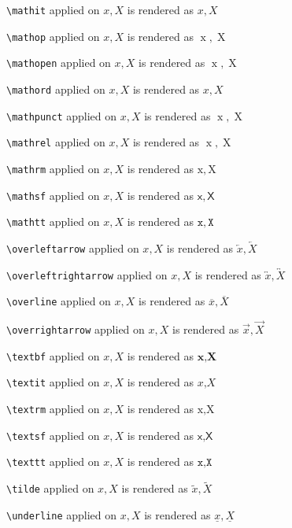 \texttt{\textbackslash mathit} applied on $x,X$ is rendered as $\mathit{x},\mathit{X}$


\texttt{\textbackslash mathop} applied on $x,X$ is rendered as $\mathop{x},\mathop{X}$


\texttt{\textbackslash mathopen} applied on $x,X$ is rendered as $\mathopen{x},\mathopen{X}$


\texttt{\textbackslash mathord} applied on $x,X$ is rendered as $\mathord{x},\mathord{X}$


\texttt{\textbackslash mathpunct} applied on $x,X$ is rendered as $\mathpunct{x},\mathpunct{X}$


\texttt{\textbackslash mathrel} applied on $x,X$ is rendered as $\mathrel{x},\mathrel{X}$


\texttt{\textbackslash mathrm} applied on $x,X$ is rendered as $\mathrm{x},\mathrm{X}$


\texttt{\textbackslash mathsf} applied on $x,X$ is rendered as $\mathsf{x},\mathsf{X}$


\texttt{\textbackslash mathtt} applied on $x,X$ is rendered as $\mathtt{x},\mathtt{X}$


\texttt{\textbackslash overleftarrow} applied on $x,X$ is rendered as $\overleftarrow{x},\overleftarrow{X}$


\texttt{\textbackslash overleftrightarrow} applied on $x,X$ is rendered as $\overleftrightarrow{x},\overleftrightarrow{X}$


\texttt{\textbackslash overline} applied on $x,X$ is rendered as $\overline{x},\overline{X}$


\texttt{\textbackslash overrightarrow} applied on $x,X$ is rendered as $\overrightarrow{x},\overrightarrow{X}$


\texttt{\textbackslash textbf} applied on $x,X$ is rendered as $\textbf{x},\textbf{X}$


\texttt{\textbackslash textit} applied on $x,X$ is rendered as $\textit{x},\textit{X}$


\texttt{\textbackslash textrm} applied on $x,X$ is rendered as $\textrm{x},\textrm{X}$


\texttt{\textbackslash textsf} applied on $x,X$ is rendered as $\textsf{x},\textsf{X}$


\texttt{\textbackslash texttt} applied on $x,X$ is rendered as $\texttt{x},\texttt{X}$


\texttt{\textbackslash tilde} applied on $x,X$ is rendered as $\tilde{x},\tilde{X}$


\texttt{\textbackslash underline} applied on $x,X$ is rendered as $\underline{x},\underline{X}$


